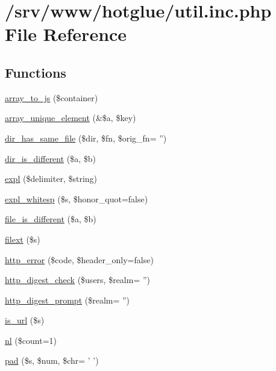\hypertarget{util_8inc_8php}{
\section{/srv/www/hotglue/util.inc.php File Reference}
\label{util_8inc_8php}
}
\subsection*{Functions}
\begin{DoxyCompactItemize}
\item 
\hyperlink{util_8inc_8php_a61d3b2881d9368741c71509017724bc8}{array\_\-to\_\-js} (\$container)
\item 
\hyperlink{util_8inc_8php_a4647462c98447c6c2842f70d8c313f85}{array\_\-unique\_\-element} (\&\$a, \$key)
\item 
\hyperlink{util_8inc_8php_a7f3e06b0a6f405290cb4d7990b8ac5c6}{dir\_\-has\_\-same\_\-file} (\$dir, \$fn, \$orig\_\-fn= '')
\item 
\hyperlink{util_8inc_8php_a6309f576f2611237288d0dd3eed09db3}{dir\_\-is\_\-different} (\$a, \$b)
\item 
\hyperlink{util_8inc_8php_aafce787d4b725ac62be6306ff3e352e7}{expl} (\$delimiter, \$string)
\item 
\hyperlink{util_8inc_8php_a1d2500a5e237e59956b03cbea845c95a}{expl\_\-whitesp} (\$s, \$honor\_\-quot=false)
\item 
\hyperlink{util_8inc_8php_a9c9a81ec9dba8b2870cbb365f8139866}{file\_\-is\_\-different} (\$a, \$b)
\item 
\hyperlink{util_8inc_8php_a6d9392e51344c2e8720a0c1982ebea21}{filext} (\$s)
\item 
\hyperlink{util_8inc_8php_ae51039516309f10d5be73220f351e808}{http\_\-error} (\$code, \$header\_\-only=false)
\item 
\hyperlink{util_8inc_8php_aff065fbc9f3abbf9c5a0ebfba22acbf7}{http\_\-digest\_\-check} (\$users, \$realm= '')
\item 
\hyperlink{util_8inc_8php_a95d221746e2d296434b0d63f78cedf57}{http\_\-digest\_\-prompt} (\$realm= '')
\item 
\hyperlink{util_8inc_8php_a0da48011cb68c039aec396c23cb04295}{is\_\-url} (\$s)
\item 
\hyperlink{util_8inc_8php_a9f9eeab2eb9a39518e80609fc7f83842}{nl} (\$count=1)
\item 
\hyperlink{util_8inc_8php_a37ef346387afe0af2cf86a8bea887173}{pad} (\$s, \$num, \$chr= ' ')
\item 

\end{DoxyCompactItemize}

